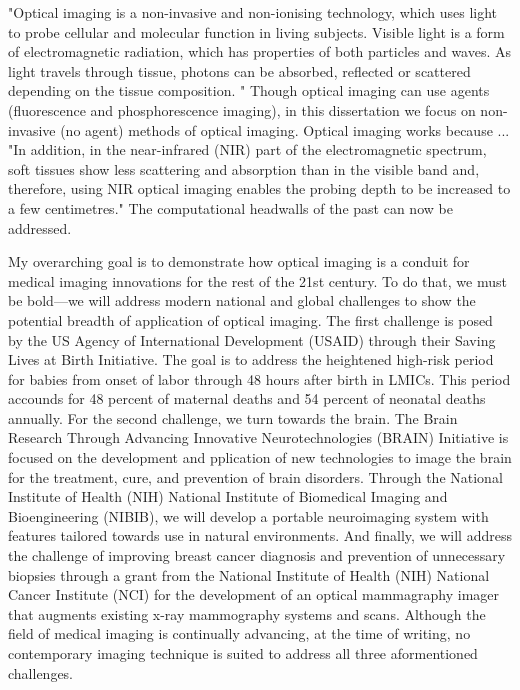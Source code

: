 "Optical imaging is a non-invasive and non-ionising technology, which uses light to probe cellular and molecular function in living subjects. Visible light is a form of electromagnetic radiation, which has properties of both particles and waves. As light travels through tissue, photons can be absorbed, reflected or scattered depending on the tissue composition. "  Though optical imaging can use agents (fluorescence and phosphorescence imaging), in this dissertation we focus on non-invasive (no agent) methods of optical imaging. Optical imaging works because ... "In addition, in the near-infrared (NIR) part of the electromagnetic spectrum, soft tissues show less scattering and absorption than in the visible band and, therefore, using NIR optical imaging enables the probing depth to be increased to a few centimetres."  The computational headwalls of the past can now be addressed. 


My overarching goal is to demonstrate how optical imaging is a conduit for medical imaging innovations for the rest of the 21st century. To do that, we must be bold---we will address modern national and global challenges to show the potential breadth of application of optical imaging. The first challenge is posed by the US Agency of International Development (USAID) through their Saving Lives at Birth Initiative. The goal is to address the heightened high-risk period for babies from onset of labor through 48 hours after birth in LMICs. This period accounds for 48 percent of maternal deaths and 54 percent of neonatal deaths annually. For the second challenge, we turn towards the brain. The Brain Research Through Advancing Innovative Neurotechnologies (BRAIN) Initiative is focused on the development and pplication of new technologies to image the brain for the treatment, cure, and prevention of brain disorders. Through the National Institute of Health (NIH) National Institute of Biomedical Imaging and Bioengineering (NIBIB), we will develop a portable neuroimaging system with features tailored towards use in natural environments. And finally, we will address the challenge of improving breast cancer diagnosis and prevention of unnecessary biopsies through a grant from the National Institute of Health (NIH) National Cancer Institute (NCI) for the development of an optical mammagraphy imager that augments existing x-ray mammography systems and scans. Although the field of medical imaging is continually advancing, at the time of writing, no contemporary imaging technique is suited to address all three aformentioned challenges. 


